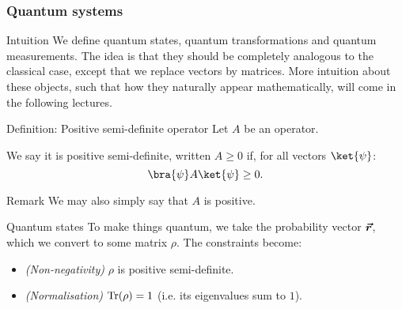 \documentclass[a4paper]{article}
\begin{document}
\subsubsection{Quantum systems}

\begin{parag}{Intuition}
    We define quantum states, quantum transformations and quantum measurements. The idea is that they should be completely analogous to the classical case, except that we replace vectors by matrices. More intuition about these objects, such that how they naturally appear mathematically, will come in the following lectures.
\end{parag}

\begin{parag}{Definition: Positive semi-definite operator}
    Let $A$ be an operator.

    We say it is positive semi-definite, written $A \geq 0$ if, for all vectors $\ket{\psi}$: 
    \[\bra{\psi} A \ket{\psi} \geq 0.\]

    \begin{subparag}{Remark}
        We may also simply say that $A$ is positive.
    \end{subparag}
\end{parag}

\begin{parag}{Quantum states}
    To make things quantum, we take the probability vector $\bm{\protect\vec{r}}$, which we convert to some matrix $\rho$. The constraints become:
    \begin{itemize}
        \item \textit{(Non-negativity)} $\rho$ is positive semi-definite.
        \item \textit{(Normalisation)} $\Tr\left(\rho\right) = 1$ (i.e. its eigenvalues sum to $1$). 
    \end{itemize}
\end{parag}
\end{document}
